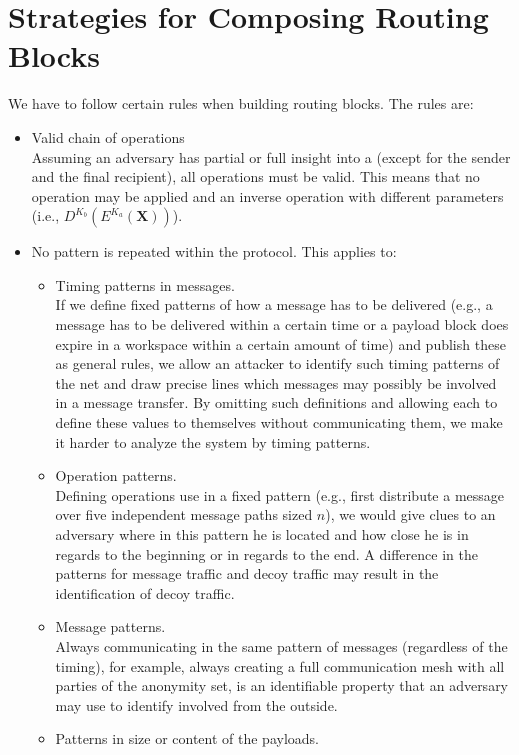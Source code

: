 \section{Strategies for Composing Routing Blocks}\label{sec:routingStrategies}
We have to follow certain rules when building routing blocks. The rules are:
\begin{itemize}
	\item Valid chain of operations\\
	      Assuming an adversary has partial or full insight into a  (except for the sender and the final recipient), all operations must be valid. This means that no operation may be applied and an inverse operation with different parameters  (i.e., $D^{K_b}\left(E^{K_a}\left(\textbf{X}\right)\right)$).
	\item No pattern is repeated within the protocol. This applies to:
	\begin{itemize}
		\item Timing patterns in messages.\\
		      If we define fixed patterns of how a message has to be delivered (e.g., a message has to be delivered within a certain time or a payload block does expire in a workspace within a certain amount of time) and publish these as general rules, we allow an attacker to identify such timing patterns of the net and draw precise lines which messages may possibly be involved in a message transfer. By omitting such definitions and allowing each  to define these values to themselves without communicating them, we make it harder to analyze the system by timing patterns.
		\item Operation patterns.\\
		      Defining operations use in a fixed pattern (e.g., first distribute a message over five independent message paths sized $n$), we would give clues to an adversary where in this pattern he is located and how close he is in regards to the beginning or in regards to the end. A difference in the patterns for message traffic and decoy traffic may result in the identification of decoy traffic.
		\item Message patterns.\\
		      Always communicating in the same pattern of messages (regardless of the timing), for example, always creating a full communication mesh with all parties of the anonymity set, is an identifiable property that an adversary may use to identify involved \VortexNodes from the outside.
		\item Patterns in size or content of the payloads.\\

\end{itemize}
\end{itemize}
